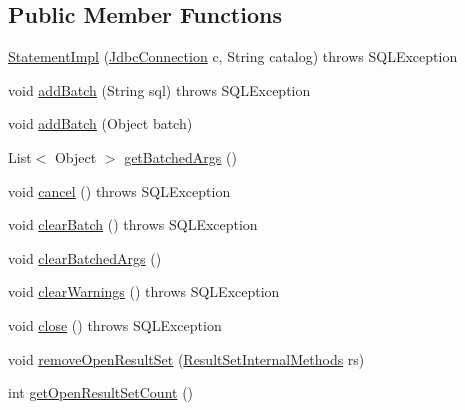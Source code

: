 \subsection*{Public Member Functions}
\begin{DoxyCompactItemize}
\item 
\mbox{\hyperlink{classcom_1_1mysql_1_1cj_1_1jdbc_1_1_statement_impl_ab7415feadb30fb623edffd1b9bd40d5d}{Statement\+Impl}} (\mbox{\hyperlink{interfacecom_1_1mysql_1_1cj_1_1jdbc_1_1_jdbc_connection}{Jdbc\+Connection}} c, String catalog)  throws S\+Q\+L\+Exception 
\item 
void \mbox{\hyperlink{classcom_1_1mysql_1_1cj_1_1jdbc_1_1_statement_impl_aea9552692a06b93f8f8ed477c5d879c4}{add\+Batch}} (String sql)  throws S\+Q\+L\+Exception 
\item 
void \mbox{\hyperlink{classcom_1_1mysql_1_1cj_1_1jdbc_1_1_statement_impl_a9fff3c6369792a80971d749bc3d2303a}{add\+Batch}} (Object batch)
\item 
List$<$ Object $>$ \mbox{\hyperlink{classcom_1_1mysql_1_1cj_1_1jdbc_1_1_statement_impl_a19609eb768e13632f7a8eb0fd14cdfd5}{get\+Batched\+Args}} ()
\item 
void \mbox{\hyperlink{classcom_1_1mysql_1_1cj_1_1jdbc_1_1_statement_impl_a89d3ae6ba7d634b3a5aa0b9014b2cf80}{cancel}} ()  throws S\+Q\+L\+Exception 
\item 
void \mbox{\hyperlink{classcom_1_1mysql_1_1cj_1_1jdbc_1_1_statement_impl_a6730720b7a5409cab4d4c537b514f7c8}{clear\+Batch}} ()  throws S\+Q\+L\+Exception 
\item 
void \mbox{\hyperlink{classcom_1_1mysql_1_1cj_1_1jdbc_1_1_statement_impl_a42618e455d715cde9a92efbc6922b252}{clear\+Batched\+Args}} ()
\item 
void \mbox{\hyperlink{classcom_1_1mysql_1_1cj_1_1jdbc_1_1_statement_impl_a7356ed117aa4417ec6ce92292f53470b}{clear\+Warnings}} ()  throws S\+Q\+L\+Exception 
\item 
void \mbox{\hyperlink{classcom_1_1mysql_1_1cj_1_1jdbc_1_1_statement_impl_ac913294cd1adc42af73229a6ba2e4f0b}{close}} ()  throws S\+Q\+L\+Exception 
\item 
void \mbox{\hyperlink{classcom_1_1mysql_1_1cj_1_1jdbc_1_1_statement_impl_aaf649eaefb9458d2857697f50ba46245}{remove\+Open\+Result\+Set}} (\mbox{\hyperlink{interfacecom_1_1mysql_1_1cj_1_1jdbc_1_1result_1_1_result_set_internal_methods}{Result\+Set\+Internal\+Methods}} rs)
\item 
int \mbox{\hyperlink{classcom_1_1mysql_1_1cj_1_1jdbc_1_1_statement_impl_ac4a8718b3d1e416f72dbe33370434b0d}{get\+Open\+Result\+Set\+Count}} ()

\end{DoxyCompactItemize}
